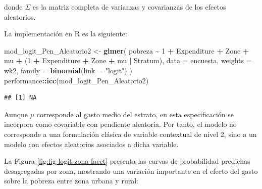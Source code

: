 \documentclass[
  spanish,
  12pt,
]{book}
\newenvironment{Shaded}{\begin{snugshade}}{\end{snugshade}}
\newcommand{\AttributeTok}[1]{\textcolor[rgb]{0.13,0.29,0.53}{#1}}
\newcommand{\DecValTok}[1]{\textcolor[rgb]{0.00,0.00,0.81}{#1}}
\newcommand{\FunctionTok}[1]{\textcolor[rgb]{0.13,0.29,0.53}{\textbf{#1}}}
\newcommand{\NormalTok}[1]{#1}
\newcommand{\OtherTok}[1]{\textcolor[rgb]{0.56,0.35,0.01}{#1}}
\newcommand{\SpecialCharTok}[1]{\textcolor[rgb]{0.81,0.36,0.00}{\textbf{#1}}}
\newcommand{\StringTok}[1]{\textcolor[rgb]{0.31,0.60,0.02}{#1}}
\begin{document}
donde \(\Sigma\) es la matriz completa de varianzas y covarianzas de los efectos aleatorios.

La implementación en R es la siguiente:

\begin{Shaded}
\begin{Highlighting}[]
\NormalTok{mod\_logit\_Pen\_Aleatorio2 }\OtherTok{\textless{}{-}} \FunctionTok{glmer}\NormalTok{(}
\NormalTok{  pobreza }\SpecialCharTok{\textasciitilde{}} \DecValTok{1} \SpecialCharTok{+}\NormalTok{ Expenditure }\SpecialCharTok{+}\NormalTok{ Zone }\SpecialCharTok{+}\NormalTok{ mu }\SpecialCharTok{+}
\NormalTok{    (}\DecValTok{1} \SpecialCharTok{+}\NormalTok{ Expenditure }\SpecialCharTok{+}\NormalTok{ Zone }\SpecialCharTok{+}\NormalTok{ mu }\SpecialCharTok{|}\NormalTok{ Stratum),}
  \AttributeTok{data    =}\NormalTok{ encuesta,}
  \AttributeTok{weights =}\NormalTok{ wk2,}
  \AttributeTok{family  =} \FunctionTok{binomial}\NormalTok{(}\AttributeTok{link =} \StringTok{"logit"}\NormalTok{)}
\NormalTok{)}
\NormalTok{performance}\SpecialCharTok{::}\FunctionTok{icc}\NormalTok{(mod\_logit\_Pen\_Aleatorio2)}
\end{Highlighting}
\end{Shaded}

\begin{verbatim}
## [1] NA
\end{verbatim}

Aunque \(\mu\) corresponde al gasto medio del estrato, en esta especificación se incorpora como covariable con pendiente aleatoria. Por tanto, el modelo no corresponde a una formulación clásica de variable contextual de nivel 2, sino a un modelo con efectos aleatorios asociados a dicha variable.

La Figura \ref{fig:fig-logit-zona-facet} presenta las curvas de probabilidad predichas desagregadas por zona, mostrando una variación importante en el efecto del gasto sobre la pobreza entre zona urbana y rural:

\begin{Shaded}
\end{Shaded}
\end{document}
